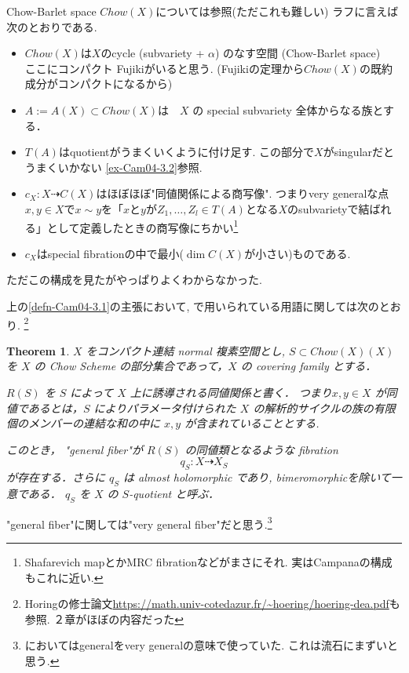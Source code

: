 \documentclass[dvipdfmx,a4paper,11pt]{article} %
\newtheorem{thm}{Theorem}[section]
\theoremstyle{definition}
\theoremstyle{remark}
\numberwithin{equation}{section}
\begin{document}
Chow-Barlet space $Chow(X)$については\cite[8章]{SCV7}参照(ただこれも難しい)
ラフに言えば次のとおりである. 
\begin{itemize}
\item $Chow(X)$は$X$のcycle (subvariety + $\alpha$) のなす空間 (Chow-Barlet space)　ここにコンパクト Fujikiがいると思う. (Fujikiの定理から$Chow(X)$の既約成分がコンパクトになるから)
\item $A:=A(X)\subset Chow(X)$は　\(X\) の special subvariety 全体からなる族とする．
\item $T(A)$はquotientがうまくいくように付け足す. この部分で$X$がsingularだとうまくいかない \ref{ex-Cam04-3.2}参照.
\item \(c_X : X\dashrightarrow C(X)\)はほぼほぼ"同値関係による商写像". つまりvery generalな点$x, y \in X$で$x \sim y$を「$x$と$y$が$Z_1, \ldots, Z_l \in T(A)$となる$X$のsubvarietyで結ばれる」として定義したときの商写像にちかい\footnote{Shafarevich mapとかMRC fibrationなどがまさにそれ. 実はCampanaの構成もこれに近い. }
\item $c_X$はspecial fibrationの中で最小($\dim C(X)$が小さい)ものである.
\end{itemize}
ただこの構成を見たがやっぱりよくわからなかった. 

上の\ref{defn-Cam04-3.1}の主張において, \cite{Cam04a} で用いられている用語に関しては次のとおり. \footnote{Horingの修士論文\url{https://math.univ-cotedazur.fr/~hoering/hoering-dea.pdf}も参照. ２章がほぼ\cite{Cam04a}の内容だった}

\begin{thm}\cite[1.1]{Cam04a} 
\(X\) をコンパクト連結 normal 複素空間とし, \(S \subset Chow(X)(X)\) を \(X\) の Chow Scheme の部分集合であって，\(X\) の covering family とする．

\(R(S)\) を \(S\) によって \(X\) 上に誘導される同値関係と書く．
つまり\(x,y \in X\) が同値であるとは，\(S\) によりパラメータ付けられた \(X\) の解析的サイクルの族の有限個のメンバーの連結な和の中に \(x,y\) が含まれていることとする. 

このとき， "general fiber"が \(R(S)\) の同値類となるような fibration
\[
q_S : X \dashrightarrow X_S
\]
が存在する．さらに \(q_S\) は almost holomorphic であり, bimeromorphicを除いて一意である．
 \(q_S\) を \(X\) の \(S\)-quotient と呼ぶ．
\end{thm}

"general fiber"に関しては"very general fiber"だと思う.\footnote{\cite{Cam04}においてはgeneralをvery generalの意味で使っていた. これは流石にまずいと思う. } 
\end{document}
